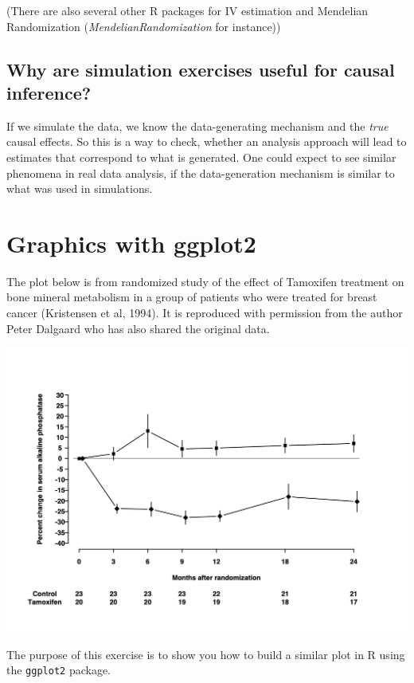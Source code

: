 \documentclass[
]{book}
\begin{document}
(There are also several other R packages for IV estimation and Mendelian Randomization (\emph{MendelianRandomization} for instance))

\section{Why are simulation exercises useful for causal inference?}\label{why-are-simulation-exercises-useful-for-causal-inference}

If we simulate the data, we know the data-generating mechanism and the \emph{true} causal effects. So this is a way to check, whether
an analysis approach will lead to estimates that correspond to what is generated. One could expect to see similar phenomena in real
data analysis, if the data-generation mechanism is similar to what was used in simulations.

\chapter{Graphics with ggplot2}\label{graphics-with-ggplot2}

The plot below is from randomized study of the effect of Tamoxifen treatment on bone mineral metabolism in a group of patients who were treated for breast cancer (Kristensen et al, 1994). It is reproduced with permission from the author Peter Dalgaard who has also shared the original data.

\includegraphics{./graph/bentK.png}

The purpose of this exercise is to show you how to build a similar plot in R using the \texttt{ggplot2} package.
\end{document}
